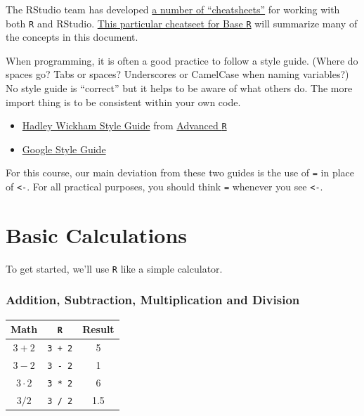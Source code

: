 \documentclass[]{book}
\providecommand{\tightlist}{%
  \setlength{\itemsep}{0pt}\setlength{\parskip}{0pt}}
\theoremstyle{definition}
\theoremstyle{definition}
\theoremstyle{definition}
\theoremstyle{remark}
\begin{document}
The RStudio team has developed
\href{https://www.rstudio.com/resources/cheatsheets/}{a number of
``cheatsheets''} for working with both \texttt{R} and RStudio.
\href{http://www.rstudio.com/wp-content/uploads/2016/05/base-r.pdf}{This
particular cheatseet for Base \texttt{R}} will summarize many of the
concepts in this document.

When programming, it is often a good practice to follow a style guide.
(Where do spaces go? Tabs or spaces? Underscores or CamelCase when
naming variables?) No style guide is ``correct'' but it helps to be
aware of what others do. The more import thing is to be consistent
within your own code.

\begin{itemize}
\tightlist
\item
  \href{http://adv-r.had.co.nz/Style.html}{Hadley Wickham Style Guide}
  from \href{http://adv-r.had.co.nz/}{Advanced \texttt{R}}
\item
  \href{https://google.github.io/styleguide/Rguide.xml}{Google Style
  Guide}
\end{itemize}

For this course, our main deviation from these two guides is the use of
\texttt{=} in place of \texttt{\textless{}-}. For all practical
purposes, you should think \texttt{=} whenever you see
\texttt{\textless{}-}.

\section{Basic Calculations}\label{basic-calculations}

To get started, we'll use \texttt{R} like a simple calculator.

\subsubsection*{Addition, Subtraction, Multiplication and
Division}\label{addition-subtraction-multiplication-and-division}

\begin{longtable}[]{@{}ccc@{}}
\toprule
Math & \texttt{R} & Result\tabularnewline
\midrule
\endhead
\(3 + 2\) & \texttt{3\ +\ 2} & 5\tabularnewline
\(3 - 2\) & \texttt{3\ -\ 2} & 1\tabularnewline
\(3 \cdot2\) & \texttt{3\ *\ 2} & 6\tabularnewline
\(3 / 2\) & \texttt{3\ /\ 2} & 1.5\tabularnewline
\bottomrule
\end{longtable}
\end{document}
